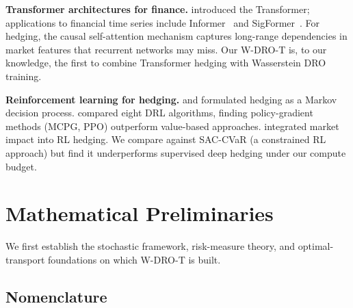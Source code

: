 \documentclass[11pt]{article}
\begin{document}
\textbf{Transformer architectures for finance.}
\citet{vaswani2017attention} introduced the Transformer; applications to financial time series include Informer~\citep{zhou2021informer} and SigFormer~\citep{tong2023sigformer}.  For hedging, the causal self-attention mechanism captures long-range dependencies in market features that recurrent networks may miss.  Our W-DRO-T is, to our knowledge, the first to combine Transformer hedging with Wasserstein DRO training.

\textbf{Reinforcement learning for hedging.}
\citet{kolm2019dynamic} and \citet{cao2021deep} formulated hedging as a Markov decision process.  \citet{neagu2025drl} compared eight DRL algorithms, finding policy-gradient methods (MCPG, PPO) outperform value-based approaches.  \citet{pickard2025rl} integrated market impact into RL hedging.  We compare against SAC-CVaR (a constrained RL approach) but find it underperforms supervised deep hedging under our compute budget.

\section{Mathematical Preliminaries}
\label{sec:background}

We first establish the stochastic framework, risk-measure theory, and optimal-transport foundations
on which W-DRO-T is built.

\subsection{Nomenclature}
\end{document}

